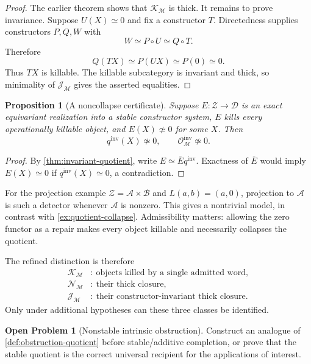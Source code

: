 \documentclass[11pt]{article}
\newtheorem{proposition}[theorem]{Proposition}
\theoremstyle{definition}
\newtheorem{problem}[theorem]{Open Problem}
\theoremstyle{remark}
\begin{document}
\begin{proof}
The earlier theorem shows that $\mathcal K_{\mathscr M}$ is thick. It remains to prove invariance. Suppose $U(X)\simeq0$ and fix a constructor $T$. Directedness supplies constructors $P,Q,W$ with
\[
W\simeq P\circ U\simeq Q\circ T.
\]
Therefore
\[
Q(TX)\simeq P(UX)\simeq P(0)\simeq0.
\]
Thus $TX$ is killable. The killable subcategory is invariant and thick, so minimality of $\mathcal J_{\mathscr M}$ gives the asserted equalities.
\end{proof}

\begin{proposition}[A noncollapse certificate]\label{prop:noncollapse}
Suppose $E:\mathcal Z\to\mathcal D$ is an exact equivariant realization into a stable constructor system, $E$ kills every operationally killable object, and $E(X)\not\simeq0$ for some $X$. Then
\[
q^{\mathrm{inv}}(X)\not\simeq0,
\qquad
\mathcal O^{\mathrm{inv}}_{\mathscr M}\not\simeq0.
\]
\end{proposition}

\begin{proof}
By \cref{thm:invariant-quotient}, write $E\simeq\bar E q^{\mathrm{inv}}$. Exactness of $\bar E$ would imply $E(X)\simeq0$ if $q^{\mathrm{inv}}(X)\simeq0$, a contradiction.
\end{proof}

For the projection example $\mathcal Z=\mathcal A\times\mathcal B$ and $L(a,b)=(a,0)$, projection to $\mathcal A$ is such a detector whenever $\mathcal A$ is nonzero. This gives a nontrivial model, in contrast with \cref{ex:quotient-collapse}. Admissibility matters: allowing the zero functor as a repair makes every object killable and necessarily collapses the quotient.

The refined distinction is therefore
\[
\begin{aligned}
\mathcal K_{\mathscr M}&:\ \text{objects killed by a single admitted word},\\
\mathcal N_{\mathscr M}&:\ \text{their thick closure},\\
\mathcal J_{\mathscr M}&:\ \text{their constructor-invariant thick closure}.
\end{aligned}
\]
Only under additional hypotheses can these three classes be identified.


\begin{problem}[Nonstable intrinsic obstruction]
Construct an analogue of \cref{def:obstruction-quotient} before stable/additive completion, or prove that the stable quotient is the correct universal recipient for the applications of interest.
\end{problem}
\end{document}
